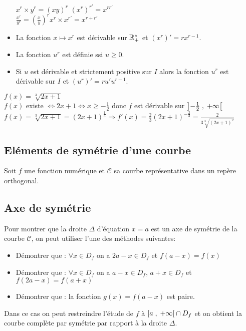 \begin{example}
\begin{itemize}
\hspace{2cm} \colorbox{green!20!} {$ x^{r}\times y^{r}= (xy)^{r} $ \qquad \qquad  $ (x^{r})^{r'}=x^{rr'} $} \\

\hspace{2cm}  \colorbox{green!20!}{$ \frac{x^{r}}{y^{r}}=(\frac{x}{y})^{r} $\qquad \qquad  $ x^{r}\times x^{r'}=x^{r+r'} $}\\

\item La fonction $x  \longmapsto x^{r}  $ est dérivable sur $ \mathbb{R}_+^* $ et $( x^{r})'=rx^{r-1}$.
\item La fonction $ u^{r} $ est définie ssi $ u\geq 0. $
  \item   Si $ u $ est dérivable et strictement positive sur $ I $ alors la fonction  $ u^{r} $ est dérivable sur $ I $ et $ (u^{r})'=ru'u^{r-1} $.
 \end{itemize}
 \begin{example}
 $ f(x)= \sqrt[3]{2x+1} $\\
 $ f(x) $  existe $ \Leftrightarrow 2x+1 \Leftrightarrow x \geq -\frac{1}{2} $ donc $ f $ est dérivable sur $ \left]-\frac{1}{2} \;,\; +\infty\right[ $\\
  $ f(x)= \sqrt[3]{2x+1}=(2x+1)^{\frac{1}{3}}\Longrightarrow f'(x)=\frac{2}{3}(2x+1)^{-\frac{2}{3}}=\frac{2}{3\sqrt[3]{(2x+1)^2}} $
 \end{example}

\subsection{ Eléments de symétrie d'une courbe}
Soit $ f $ une fonction numérique et $ \mathcal{C} $ sa courbe représentative dans un repère orthogonal.

\subsection{Axe de symétrie}
Pour montrer que la droite $ \Delta $ d'équation $ x=a $ est un axe de symétrie de la courbe $ \mathcal{C} $,  on peut utiliser l'une des méthodes suivantes: 
\begin{itemize}
\item Démontrer que : $ \forall x\in D_{f}$  on a   $ 2a-x\in D_{f}$ et $ f(a-x)=f(x) $
\item Démontrer que : $ \forall x\in D_{f}$  on a  $ a-x\in D_{f}$, $ a+x\in D_{f}$ et $ f(2a-x)=f(a+x) $
\item Démontrer que : la fonction $ g(x)=f(a-x) $ est paire.
\end{itemize}
Dans ce cas on peut restreindre l'étude de $ f $ à $ \left[a \;,\; +\infty\right[\cap D_{f}$ et on obtient la courbe complète par symétrie par rapport à la droite $ \Delta $.


\end{example}
